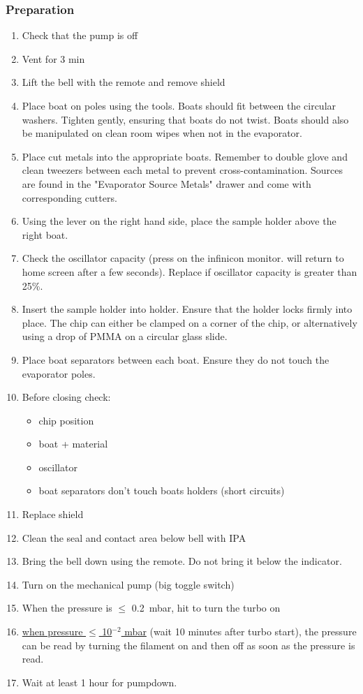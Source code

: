 \subsubsection{Preparation}
\begin{enumerate}
\item Check that the pump is off
\item Vent for 3 min
\item Lift the bell with the remote and remove shield
\item Place boat on poles using the tools. Boats should fit between the circular washers. Tighten gently, ensuring that
boats do not twist. Boats should also be manipulated on clean room wipes when not in the evaporator.
\item Place cut metals into the appropriate boats. Remember to double glove and clean tweezers between each metal
to prevent cross-contamination. Sources are found in the "Evaporator Source Metals" drawer and come with corresponding cutters.
\item Using the lever on the right hand side, place the sample holder above the right boat.
\item Check the oscillator capacity (press  on the infinicon monitor. will return to home screen after a few seconds). Replace if
oscillator capacity is greater than 25\%.
\item Insert the sample holder into holder. Ensure that the holder locks firmly into place. The chip can either be clamped on a corner of the chip,
      or alternatively using a drop of PMMA on a circular glass slide.
\item Place boat separators between each boat. Ensure they do not touch the evaporator poles.
\item Before closing check:
\begin{itemize}[nolistsep,noitemsep]
  \item chip position
  \item boat + material
  \item oscillator
  \item boat separators don't touch boats holders (short circuits)
\end{itemize}
\item Replace shield
\item Clean the seal and contact area below bell with IPA
\item Bring the bell down using the remote. Do not bring it below the indicator.
\item Turn on the mechanical pump (big toggle switch)
\item When the pressure is $\leq$ \SI{0.2}{\milli\bar}, hit  to turn the turbo on\\
\item \underline{when pressure $\leq$ 10$^{-2}$ mbar} (wait 10 minutes after turbo start), the pressure can be read by turning the filament on and then off as soon as the pressure is read.\\
\item Wait at least 1 hour for pumpdown.
\end{enumerate}

